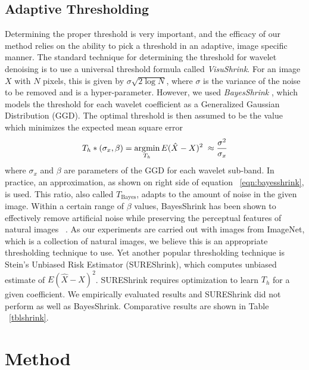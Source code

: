 \subsection{Adaptive Thresholding \label{sec:contentthresholding}}
Determining the proper threshold is very important, and the efficacy of our method relies on the ability to pick a threshold in an adaptive, image specific manner.
The standard technique for determining the threshold for wavelet denoising is to use a universal threshold formula called \textit{VisuShrink}. 
For an image $X$ with $N$ pixels, this is given by $\sigma\sqrt{2\log N}$, where $\sigma$ is the variance of the noise to be removed and is a hyper-parameter. 
However, we used \textit{BayesShrink} \cite{BayesShrinkChang2000}, which models the threshold for each wavelet coefficient as a Generalized Gaussian Distribution (GGD). 
The optimal threshold is then assumed to be the value which minimizes the expected mean square error \ie
\begin{equation}
T_h*(\sigma_x, \beta) = \operatorname*{\arg\!\min}_{T_h} E(\hat{X} - X)^2 \; \approx \frac{\sigma^2}{\sigma_x}
\label{eqn:bayesshrink}
\end{equation}
where $\sigma_x$ and $\beta$ are parameters of the GGD for each wavelet sub-band.
In practice, an approximation, as shown on right side of equation ~\ref{eqn:bayesshrink}, is used. 
This ratio, also called $T_{\text{Bayes}}$, adapts to the amount of noise in the given image.
Within a certain range of $\beta$ values, BayesShrink has been shown to effectively remove artificial noise while preserving the perceptual features of natural images ~\cite{BayesShrinkChang2000,WaveletDenoisingRangarajan2002}.
As our experiments are carried out with images from ImageNet, which is a collection of natural images, we believe this is an appropriate thresholding technique to use.
Yet another popular thresholding technique is Stein's Unbiased Risk Estimator (SUREShrink), which computes unbiased estimate of $E(\hat{X} - X)^2 $. SUREShrink requires optimization to learn $T_h$ for a given coefficient. We empirically evaluated results and SUREShrink did not perform as well as BayesShrink. Comparative results are  shown in Table ~\ref{tblshrink}.

\section{Method}

